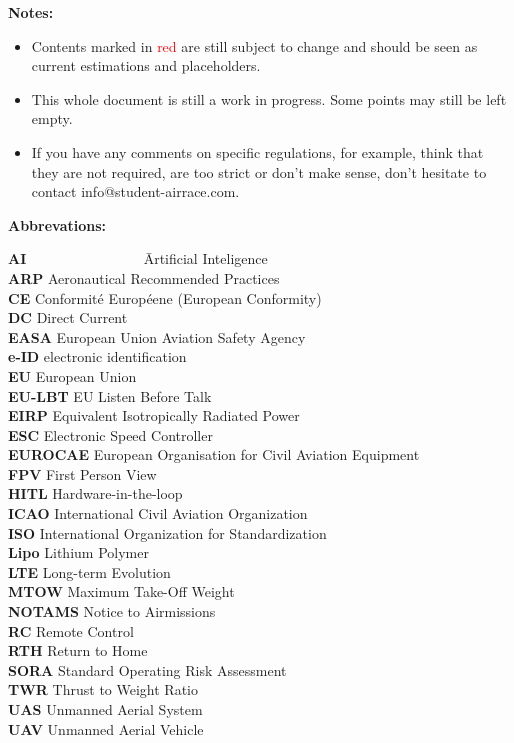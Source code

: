 \documentclass{article}
\begin{document}
\newpage
{\bf Notes:
\begin{itemize}
  \item Contents marked in \textcolor{red}{red} are still subject to change and should be seen as current estimations and placeholders.
  \item This whole document is still a work in progress. Some points may still be left empty.
  \item If you have any comments on specific regulations, for example, think that they are not required, are too strict or don't make sense, don't hesitate to contact info@student-airrace.com.
\end{itemize}
}
\hspace{10mm}

{\bf Abbrevations:}
\begin{tabbing}
  {\bf AI~~~~~~~~~~~~~~} \= Artificial Inteligence
  \\{\bf ARP} \> Aeronautical Recommended Practices
  \\{\bf CE} \> Conformité Européene (European Conformity)
  \\{\bf DC} \> Direct Current
  \\{\bf EASA} \> European Union Aviation Safety Agency
  \\{\bf e-ID} \> electronic identification
  \\{\bf EU} \> European Union
  \\{\bf EU-LBT} \> EU Listen Before Talk
  \\{\bf EIRP} \> Equivalent Isotropically Radiated Power
  \\{\bf ESC} \> Electronic Speed Controller
  \\{\bf EUROCAE} \> European Organisation for Civil Aviation Equipment
  \\{\bf FPV} \> First Person View
  \\{\bf HITL} \> Hardware-in-the-loop
  \\{\bf ICAO} \> International Civil Aviation Organization
  \\{\bf ISO} \> International Organization for Standardization
  \\{\bf Lipo} \> Lithium Polymer
  \\{\bf LTE} \> Long-term Evolution
  \\{\bf MTOW} \> Maximum Take-Off Weight
  \\{\bf NOTAMS} \> Notice to Airmissions
  \\{\bf RC} \> Remote Control
  \\{\bf RTH} \> Return to Home
  \\{\bf SORA} \> Standard Operating Risk Assessment
  \\{\bf TWR} \> Thrust to Weight Ratio
  \\{\bf UAS} \> Unmanned Aerial System
  \\{\bf UAV} \> Unmanned Aerial Vehicle
\end{tabbing}
\end{document}
